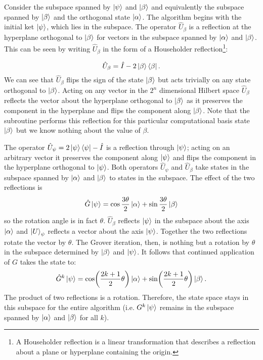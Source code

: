 Consider the subspace spanned by $\ket{\psi}$ and $\ket{\beta}$ and equivalently the subspace spanned by $\ket{\beta}$ and the orthogonal state $\ket{\alpha}$.
The algorithm begins with the initial ket $\ket{\psi}$, which lies in the subspace. The operator $\hat{U}_\beta$ is a reflection at the hyperplane orthogonal to $\ket{\beta}$ for vectors in the subspace spanned by $\ket{\alpha}$ and $\ket{\beta}$. This can be seen by writing $\hat{U}_\beta$ in the form of a Householder reflection\footnote{A Householder reflection is a linear transformation that describes a reflection about a plane or hyperplane containing the origin.}:

\begin{equation*}
    \hat{U}_\beta = \hat{I} - 2 \ket{\beta}\bra{\beta}.
\end{equation*}
We can see that $\hat{U}_\beta$ flips the sign of the state $\ket{\beta}$ but acts trivially on any state orthogonal to $\ket{\beta}$. Acting on any vector in the $2^n$ dimensional Hilbert space $\hat{U}_\beta$  reflects the vector about the hyperplane orthogonal to $\ket{\beta}$ as it preserves the component in the hyperplane and flips the component along $\ket{\beta}$. Note that the subroutine performs this reflection for this particular computational basis state $\ket{\beta}$ but we know nothing about the value of $\beta$.

 The operator $\hat{U}_\psi = 2 \ket{\psi}\bra{\psi} - \hat{I}$ is a reflection through $\ket{\psi}$; acting on an arbitrary vector it preserves the component along $\ket{\psi}$ and flips the component in the hyperplane orthogonal to $\ket{\psi}$. Both operators $\hat{U}_\psi$ and $\hat{U}_\beta$ take states in the subspace spanned by $\ket{\alpha}$ and $\ket{\beta}$ to states in the subspace. The effect of the two reflections is
 \begin{equation*}
    \hat{G}\ket{\psi} = \cos\frac{3\theta}{2} \ket{\alpha} + \sin\frac{3\theta}{2} \ket{\beta}
\end{equation*}
so the rotation angle is in fact $\theta$. $\hat{U}_\beta$ reflects $\ket{\psi}$ in the subspace about the axis $\ket{\alpha}$ and $\ket{U}_\psi$ reflects a vector about the axis $\ket{\psi}$. Together the two reflections rotate the vector by $\theta$. The Grover iteration, then, is nothing but a rotation by $\theta$ in the subspace determined by $\ket{\beta}$ and $\ket{\psi}$.
It follows that continued application of $G$ takes the state to:
\begin{equation}\label{eq:Gk}
    \hat{G}^{k}\ket{\psi} = \cos\biggl(\frac{2k+1}{2}\theta\biggr) \ket{\alpha} + \sin\biggl(\frac{2k+1}{2}\theta\biggr) \ket{\beta}.
\end{equation}
The product of two reflections is a rotation. Therefore, the state space stays in this subspace for the entire algorithm (i.e. $G^k\ket{\psi}$ remains in the subspace spanned by $\ket{\alpha}$ and $\ket{\beta}$ for all $k$). 

